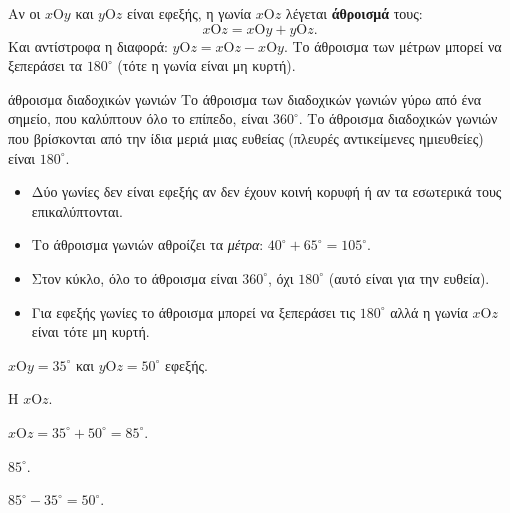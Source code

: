 \begin{center}
\end{center}


Αν οι $x\mathrm{Ο}y$ και $y\mathrm{Ο}z$ είναι εφεξής, η γωνία $x\mathrm{Ο}z$ λέγεται \textbf{άθροισμά} τους:
$$x\mathrm{Ο}z=x\mathrm{Ο}y+y\mathrm{Ο}z.$$
Και αντίστροφα η διαφορά: $y\mathrm{Ο}z=x\mathrm{Ο}z-x\mathrm{Ο}y$. Το άθροισμα των μέτρων μπορεί να ξεπεράσει τα $180^\circ$ (τότε η γωνία είναι μη κυρτή).

\begin{idiotita}{άθροισμα διαδοχικών γωνιών}
Το άθροισμα των διαδοχικών γωνιών γύρω από ένα σημείο, που καλύπτουν όλο το επίπεδο, είναι $360^\circ$. Το άθροισμα διαδοχικών γωνιών που βρίσκονται από την ίδια μεριά μιας ευθείας (πλευρές αντικείμενες ημιευθείες) είναι $180^\circ$.
\end{idiotita}

\begin{prosoxi}
\begin{itemize}[leftmargin=1.2em,itemsep=0.3ex,topsep=2pt]
\item Δύο γωνίες δεν είναι εφεξής αν δεν έχουν κοινή κορυφή ή αν τα εσωτερικά τους επικαλύπτονται.
\item Το άθροισμα γωνιών αθροίζει τα \emph{μέτρα}: $40^\circ+65^\circ=105^\circ$.
\item Στον κύκλο, όλο το άθροισμα είναι $360^\circ$, όχι $180^\circ$ (αυτό είναι για την ευθεία).
\item Για εφεξής γωνίες το άθροισμα μπορεί να ξεπεράσει τις $180^\circ$ αλλά η γωνία $x\mathrm{Ο}z$ είναι τότε μη κυρτή.
\end{itemize}
\end{prosoxi}


\tixero $x\mathrm{Ο}y=35^\circ$ και $y\mathrm{Ο}z=50^\circ$ εφεξής.\par
\tithelo Η $x\mathrm{Ο}z$.\par
\possindeo $x\mathrm{Ο}z=35^\circ+50^\circ=85^\circ$.\par
\apantisi $85^\circ$.\par
\elegxos $85^\circ-35^\circ=50^\circ$.

